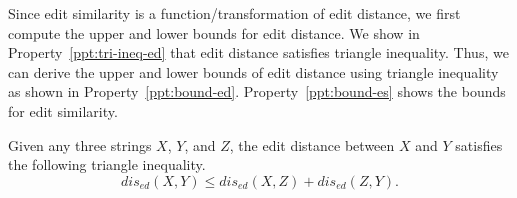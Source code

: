 \begin{table}[tb]
\caption{Edit distance tables for Example~\ref{example:comp-edit} and Example~\ref{example:bound-ed}}
\label{ed-comp}
\centering
{}
\quad
{}

\end{table}


Since edit similarity is a function/transformation of edit distance, we first compute the upper and lower bounds for edit distance. We show in Property~\ref{ppt:tri-ineq-ed} that edit distance satisfies triangle inequality. Thus, we can derive the upper and lower bounds of edit distance using triangle inequality as shown in Property~\ref{ppt:bound-ed}. Property~\ref{ppt:bound-es} shows the bounds for edit similarity. 

\begin{property}\label{ppt:tri-ineq-ed}
Given any three strings $X$, $Y$, and $Z$, the edit distance between $X$ and $Y$ satisfies the following triangle inequality. 
$$dis_{ed}(X,Y) \leq dis_{ed}(X,Z)+dis_{ed}(Z,Y).$$
\end{property}


